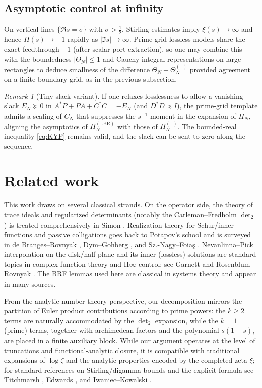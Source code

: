 \documentclass[11pt]{article}
\theoremstyle{definition}
\theoremstyle{remark}
\newtheorem{remark}[theorem]{Remark}
\DeclareMathOperator{\dettwo}{det_2}
\begin{document}
\subsection{Asymptotic control at infinity}
On vertical lines \(\{\Re s=\sigma\}\) with \(\sigma>\tfrac12\), Stirling estimates imply \(\xi(s)\to\infty\) and hence \(H(s)\to -1\) rapidly as \(|\Im s|\to\infty\). Prime-grid lossless models share the exact feedthrough \(-1\) (after scalar port extraction), so one may combine this with the boundedness \(|\Theta_N|\le 1\) and Cauchy integral representations on large rectangles to deduce smallness of the difference \(\Theta_N-\Theta_N^{(\dettwo)}\) provided agreement on a finite boundary grid, as in the previous subsection.
\begin{remark}[Tiny slack variant]
If one relaxes losslessness to allow a vanishing slack \(E_N\succeq 0\) in \(A^*P+PA+C^*C=-E_N\) (and \(D^*D\preceq I\)), the prime-grid template admits a scaling of \(C_N\) that suppresses the \(s^{-1}\) moment in the expansion of \(H_N\), aligning the asymptotics of \(H_N^{(\mathrm{LBR})}\) with those of \(H_N^{(\dettwo)}\). The bounded-real inequality \eqref{eq:KYP} remains valid, and the slack can be sent to zero along the sequence.
\end{remark}

\section{Related work}\label{sec:related}
This work draws on several classical strands. On the operator side, the theory of trace ideals and regularized determinants (notably the Carleman--Fredholm \(\det_2\)) is treated comprehensively in Simon \cite{SimonTraceIdeals}. Realization theory for Schur/inner functions and passive colligations goes back to Potapov's school and is surveyed in de Branges--Rovnyak \cite{deBrangesRovnyak}, Dym--Gohberg \cite{DymGohberg}, and Sz.-Nagy--Foia\c{s} \cite{SzNagyFoias}. Nevanlinna--Pick interpolation on the disk/half-plane and its inner (lossless) solutions are standard topics in complex function theory and H\(\infty\) control; see Garnett \cite{Garnett} and Rosenblum--Rovnyak \cite{RosenblumRovnyak}. The BRF lemmas used here are classical in systems theory and appear in many sources.

From the analytic number theory perspective, our decomposition mirrors the partition of Euler product contributions according to prime powers: the \(k\ge 2\) terms are naturally accommodated by the \(\det_2\) expansion, while the \(k=1\) (prime) terms, together with archimedean factors and the polynomial \(s(1-s)\), are placed in a finite auxiliary block. While our argument operates at the level of truncations and functional-analytic closure, it is compatible with traditional expansions of \(\log \zeta\) and the analytic properties encoded by the completed zeta \(\xi\); for standard references on Stirling/digamma bounds and the explicit formula see Titchmarsh \cite{TitchmarshZeta}, Edwards \cite{Edwards}, and Iwaniec--Kowalski \cite{IwaniecKowalski}.
\end{document}
